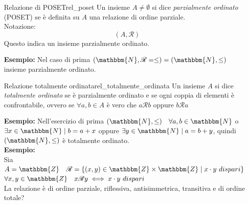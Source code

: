 \documentclass[12pt, letterpaper]{report}
\newcounter{definition}
\newcommand{\nmu}{}
\begin{document}
  		 \begin{definition}{\nmu Relazione di POSET}{rel_poset}
  			Un insieme $A \neq \emptyset$ si dice \textit{parzialmente ordinato} (POSET) se è definita su $A$ una relazione di ordine parziale. \\
  			Notazione:
  			\[
  			(A, \mathscr{R})
  			\]
  			Questo indica un insieme parzialmente ordinato.
  		\end{definition}
  		\textbf{Esempio:} Nel caso di prima $(\mathbbm{N}, \mathscr{R} = \leq) = (\mathbbm{N}, \leq)$ insieme parzialmente ordinato.
  		\begin{definition}{\nmu Relazione totalmente ordinata}{rel_totalmente_ordinata}
  		Un insieme $A$ si dice \textit{totalmente ordinato} se è parzialmente ordinato e se ogni coppia di elementi è confrontabile, ovvero se $\forall a, b \in A$ è vero che $a\mathscr{R}b$ oppure $b\mathscr{R}a$
  		\end{definition}
  		\textbf{Esempio:} Nell'esercizio di prima $(\mathbbm{N}, \leq) \quad \forall a,b \in \mathbbm{N}$ o $\exists x \in \mathbbm{N} \mid b = a + x$ oppure $\exists y \in \mathbbm{N} \mid a = b + y$, quindi $(\mathbbm{N}, \leq)$ è totalmente ordinato. \\
  		\textbf{Esempio:} \\
  		Sia $A = \mathbbm{Z} \quad \mathscr{R} = \{(x, y) \in \mathbbm{Z} \times \mathbbm{Z} \mid x \cdot y \ dispari\}$ \\
  		$\forall x, y \in \mathbbm{Z} \quad x \mathscr{R}y \iff x \cdot y \ dispari$ \\
  		La relazione è di ordine parziale, riflessiva, antisimmetrica, transitiva e di ordine totale?
\end{document}
